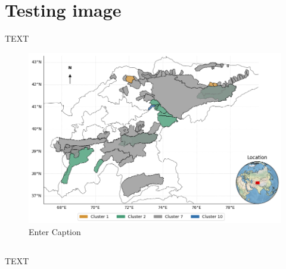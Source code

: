 \section{Testing image} %
TEXT
\begin{figure}[hbt]
    \centering
    \includegraphics[width=.8\linewidth]{images/cluster_map_tajikistan_kyrgyzstan.png}
    \caption{Enter Caption}
    \label{fig:placeholder}
\end{figure}



\subsection{} %
TEXT